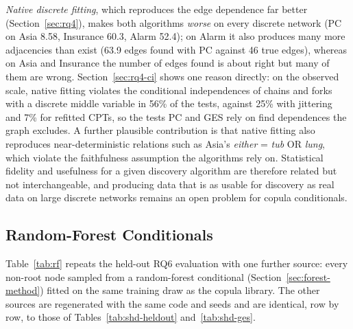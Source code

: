\documentclass[
  english,
  class=report,
  accentcolor=2c,
  marginpar=false,
  parskip=half-,
  fontsize=11pt,
  ruledheaders=false,
  pdfa=false,
  IMRAD=false,
  thesis={type=master}
]{tudapub}
\begin{document}
\emph{Native discrete fitting}, which reproduces the edge dependence far
better (Section~\ref{sec:rq4}), makes both algorithms \emph{worse} on every
discrete network (PC on Asia 8.58, Insurance 60.3, Alarm
52.4); on Alarm it also produces many more adjacencies than exist
(63.9 edges found with PC against 46 true edges), whereas on Asia and
Insurance the number of edges found is about right but many of them are
wrong. Section~\ref{sec:rq4-ci} shows one reason directly: on the observed
scale, native fitting violates the conditional independences of chains and
forks with a discrete middle variable in 56\% of the tests, against 25\%
with jittering and 7\% for refitted CPTs, so the tests PC and GES rely on
find dependences the graph excludes. A further plausible contribution is
that native fitting also reproduces near-deterministic relations such as
Asia's \emph{either} = \emph{tub} OR \emph{lung}, which violate the
faithfulness assumption the algorithms rely on. Statistical fidelity and usefulness for a given
discovery algorithm are therefore related but not interchangeable, and
producing data that is as usable for discovery as real data on large
discrete networks remains an open problem for copula conditionals.

\subsection{Random-Forest Conditionals}
\label{sec:rq6-forest}
Table~\ref{tab:rf} repeats the held-out RQ6 evaluation with one further
source: every non-root node sampled from a random-forest conditional
(Section~\ref{sec:forest-method}) fitted on the same training draw as the
copula library. The other sources are regenerated with the same code and
seeds and are identical, row by row, to those of
Tables~\ref{tab:shd-heldout} and~\ref{tab:shd-ges}.
\end{document}

